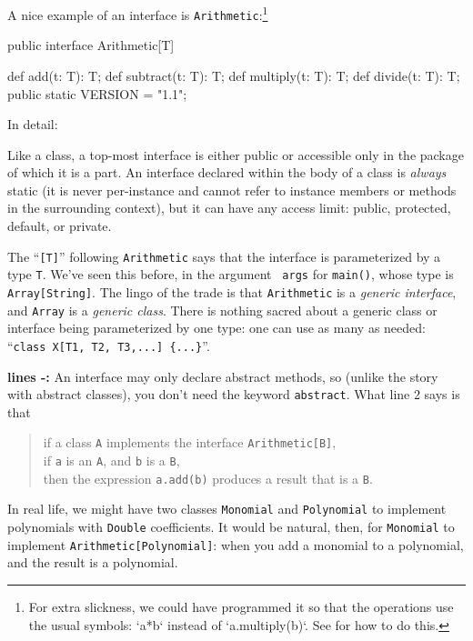 A nice example of an interface is {\tt Arithmetic}:\footnote{For extra
slickness, we could have programmed it so that the operations use the usual
symbols: \xcd`a*b` instead of \xcd`a.multiply(b)`.  See  for
how to do this.}
\begin{xtennum}[]
public interface Arithmetic[T] { 
   def add(t: T): T; 
   def subtract(t: T): T;
   def multiply(t: T): T;
   def divide(t: T): T;
   public static VERSION = "1.1";   

}
\end{xtennum}

In detail: 
\begin{description}
\item[line {\bf {}:}] 
Like a class, a top-most interface is either public or accessible only in the
package of which it is a part. An interface declared within the body of a
class is {\em always} static (it is never per-instance and cannot refer to
instance members or methods in the surrounding context), but it can have any
access limit: public, protected, default, or private.

The ``{\tt [T]}'' following {\tt Arithmetic} says that the interface is
parameterized by a type {\tt T}. We've seen this before, in the argument {\tt
  args} for {\tt main()}, whose type is {\tt Array[String]}. The lingo of the
trade is that {\tt Arithmetic} is a {\em generic interface}, and {\tt Array}
is a {\em generic class}. There is nothing sacred about a generic class or
interface being parameterized by one type: one can use as many as needed:
``{\tt class X[T1, T2, T3,...] \{...\}}''.


\item{\bf lines -:} An interface may only declare abstract methods, so (unlike the story
with abstract classes), you don't need the keyword {\tt abstract}.  What line 2 says is that
\begin{quote}
if a class {\tt A} implements the interface {\tt Arithmetic[B]},\\
if {\tt a} is an {\tt A}, and {\tt b} is a {\tt B}, \\
then the expression {\tt a.add(b)} produces a result that is a {\tt B}.
\end{quote}
In real life, we might have two classes {\tt Monomial} and {\tt Polynomial} to 
implement polynomials with {\tt Double} coefficients.  It would be natural, then,
for {\tt Monomial} to implement {\tt Arithmetic[Polynomial]}: when you add a monomial
to a polynomial, and the result is a polynomial.


\end{description}
